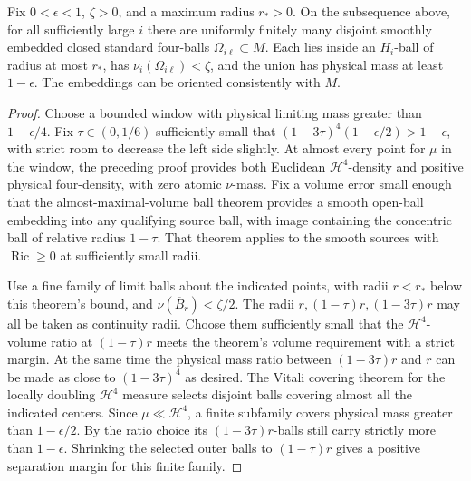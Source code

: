 \begin{corollary}
\label{vol:smooth-balls}
Fix \(0<\epsilon<1\), \(\zeta>0\), and a maximum radius
\(r_*>0\). On the subsequence above, for all sufficiently large
\(i\) there are uniformly finitely many disjoint smoothly
embedded closed standard four-balls \(\Omega_{i\ell}\subset M\).
Each lies inside an \(H_i\)-ball of radius at most \(r_*\),
has \(\nu_i(\Omega_{i\ell})<\zeta\), and the union has physical
mass at least \(1-\epsilon\). The embeddings can be oriented
consistently with \(M\).
\end{corollary}

\begin{proof}
Choose a bounded window with physical limiting mass greater than
\(1-\epsilon/4\). Fix \(\tau\in(0,1/6)\) sufficiently small that
\((1-3\tau)^4(1-\epsilon/2)>1-\epsilon\), with strict room to
decrease the left side slightly. At almost every point for \(\mu\)
in the window, the preceding proof provides both Euclidean
\(\mathcal H^4\)-density and positive physical four-density, with
zero atomic \(\nu\)-mass. Fix a volume error small enough that
the almost-maximal-volume ball theorem
\cite[Appendix A, Theorems A.1.8--A.1.9]{CheegerColding1997StructureI}
provides a smooth open-ball embedding into any qualifying source
ball, with image containing the concentric ball of relative
radius \(1-\tau\). That theorem applies to the smooth sources
with \(\operatorname{Ric}\geq0\) at sufficiently small radii.

Use a fine family of limit balls about the indicated points,
with radii \(r<r_*\) below this theorem's bound, and
\(\nu(\overline B_r)<\zeta/2\). The radii
\(r,(1-\tau)r,(1-3\tau)r\) may all be taken as continuity radii.
Choose them sufficiently small that the \(\mathcal H^4\)-volume
ratio at \((1-\tau)r\) meets the theorem's volume requirement
with a strict margin. At the same time the physical mass ratio
between \((1-3\tau)r\) and \(r\) can be made as close to
\((1-3\tau)^4\) as desired. The Vitali covering theorem for the
locally doubling \(\mathcal H^4\) measure selects disjoint balls
covering almost all the indicated centers. Since
\(\mu\ll\mathcal H^4\), a finite subfamily covers physical
mass greater than \(1-\epsilon/2\). By the ratio choice its
\((1-3\tau)r\)-balls still carry strictly more than
\(1-\epsilon\). Shrinking the selected outer balls to
\((1-\tau)r\) gives a positive separation margin for this
finite family.


\end{proof}
